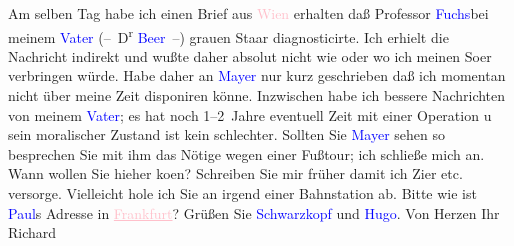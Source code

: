            \pstart
           Am selben Tag habe ich einen Brief aus \textcolor{pink}{Wien}{}\ledrightnote{\textcolor{pink}{Wien}} erhalten
               daß Professor \textcolor{blue}{Fuchs}{}\ledrightnote{\textcolor{blue}{Ernst Fuchs}}{ }{\pb}bei meinem \textcolor{blue}{Vater}{} (– D\textsuperscript{r}{ }\textcolor{blue}{Beer}{}\ledrightnote{\textcolor{blue}{Hermann Beer}} –) grauen Staar diagnosticirte. Ich erhielt
               die Nachricht indirekt und wußte daher absolut nicht wie oder wo ich meinen So{\geminationm}er verbringen würde. Habe daher an \textcolor{blue}{Mayer}{}\ledrightnote{\textcolor{blue}{Oskar Mayer}} nur kurz geschrieben {\pb}daß ich momentan nicht über meine
               Zeit disponiren könne.\pend
           \pstart
           Inzwischen habe ich bessere Nachrichten von meinem \textcolor{blue}{Vater}{}; es hat noch 1–2 Jahre eventuell Zeit mit einer
               Operation u sein moralischer Zustand ist kein schlechter. {\pb}Sollten Sie \textcolor{blue}{Mayer}{}\ledrightnote{\textcolor{blue}{Oskar Mayer}} sehen so besprechen Sie mit ihm das Nötige wegen einer
               Fußtour; ich schließe mich an.\pend
           \pstart
           Wann wollen Sie hieher ko{\geminationm}en? Schreiben Sie mir früher
               damit ich Zi{\geminationm}er etc. versorge. Vielleicht hole ich Sie
               an irgend einer Bahnstation ab.\pend
           \pstart
           {\pb}Bitte wie ist \textcolor{blue}{Paul}{}\ledrightnote{\textcolor{blue}{Paul Goldmann}}s Adresse in \textcolor{pink}{\uline{Frankfurt}}{}\ledrightnote{\textcolor{pink}{Frankfurt am Main}}? Grüßen Sie \textcolor{blue}{Schwarzkopf}{}\ledrightnote{\textcolor{blue}{Gustav Schwarzkopf}} und \textcolor{blue}{Hugo}{}\ledrightnote{\textcolor{blue}{Hugo von Hofmannsthal}}. Von Herzen\pend
           \pstart Ihr \spacefill\mbox{Richard}\pend{}\endnumbering{}  
      
